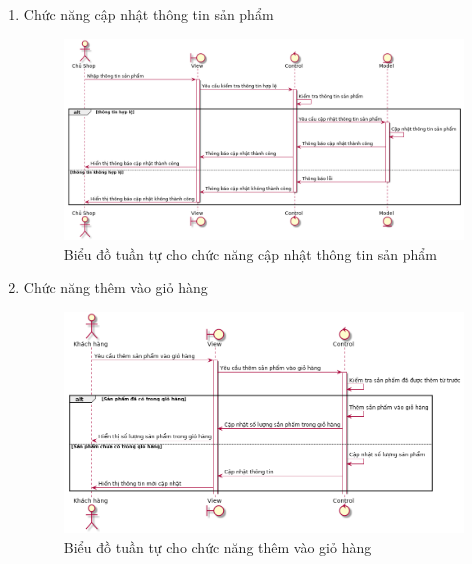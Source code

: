 \begin{enumerate}[label=\textbf{\alph*)}]
	\item Chức năng cập nhật thông tin sản phẩm
	      \begin{figure}[h!]
		      \includegraphics[scale=0.4]{fig/s_update_product_info.png}
		      \caption{Biểu đồ tuần tự cho chức năng cập nhật thông tin sản phẩm}
	      \end{figure}
	\item Chức năng thêm vào giỏ hàng
	      \begin{figure}[h!]
		      \includegraphics[scale=0.45]{fig/s_add_to_cart.png}
		      \caption{Biểu đồ tuần tự cho chức năng thêm vào giỏ hàng}
	      \end{figure}
\end{enumerate}
\newpage
